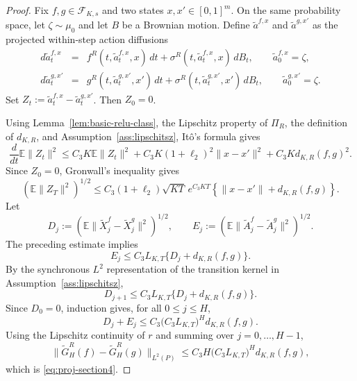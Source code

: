 \documentclass{article}
\newcommand{\1}{\mathbbm{1}}
\numberwithin{equation}{section}
\begin{document}
\begin{proof}

Fix \(f,g\in\mathcal F_{K,s}\) and two states
\(x,x'\in[0,1]^m\). On the same probability space, let
\(\zeta\sim\mu_0\) and let \(B\) be a Brownian motion. Define
\(\widetilde a^{f,x}\) and \(\widetilde a^{g,x'}\) as the projected
within-step action diffusions
\begin{eqnarray*}
    d\widetilde a^{f,x}_t
&=&
f^R(t,\widetilde a^{f,x}_t,x)\,dt
+
\sigma^R(t,\widetilde a^{f,x}_t,x)\,dB_t,
\qquad
\widetilde a^{f,x}_0=\zeta,\\
d\widetilde a^{g,x'}_t
&=&
g^R(t,\widetilde a^{g,x'}_t,x')\,dt
+
\sigma^R(t,\widetilde a^{g,x'}_t,x')\,dB_t,
\qquad
\widetilde a^{g,x'}_0=\zeta.
\end{eqnarray*}
Set \(Z_t:=\widetilde a^{f,x}_t-\widetilde a^{g,x'}_t\). Then
\(Z_0=0\).

Using Lemma~\ref{lem:basic-relu-class}, the Lipschitz property of \(\Pi_R\), the definition of \(d_{K,R}\), and Assumption~\ref{ass:lipschitsz}, It\^o's formula gives
\[
 \frac{d}{dt}\mathbb E\|Z_t\|^2
 \le
 C_3K\mathbb E\|Z_t\|^2
 +C_3K(1+\ell_2)^2\|x-x'\|^2
 +C_3K d_{K,R}(f,g)^2.
\]
Since \(Z_0=0\), Gronwall's inequality gives
\[
 \left(\mathbb E\|Z_T\|^2\right)^{1/2}
 \le
 C_3(1+\ell_2)\sqrt{KT}\,e^{C_3KT}
 \left\{\|x-x'\|+d_{K,R}(f,g)\right\}.
\]
Let
\[
 D_j:=\left(\mathbb E\|\widetilde X_j^f-\widetilde X_j^g\|^2\right)^{1/2},
 \qquad
 E_j:=\left(\mathbb E\|\widetilde A_j^f-\widetilde A_j^g\|^2\right)^{1/2}.
\]
The preceding estimate implies
\[
 E_j\le C_3L_{K,T}\{D_j+d_{K,R}(f,g)\}.
\]
By the synchronous \(L^2\) representation of the transition kernel in Assumption~\ref{ass:lipschitsz},
\[
 D_{j+1}\le C_3L_{K,T}\{D_j+d_{K,R}(f,g)\}.
\]
Since \(D_0=0\), induction gives, for all \(0\le j\le H\),
\[
 D_j+E_j\le C_3\big(C_3L_{K,T}\big)^Hd_{K,R}(f,g).
\]
Using the Lipschitz continuity of \(r\) and summing over \(j=0,\ldots,H-1\),
\[
 \|\widetilde G_H^R(f)-\widetilde G_H^R(g)\|_{L^2(P)}
 \le C_3H\big(C_3L_{K,T}\big)^Hd_{K,R}(f,g),
\]
which is \eqref{eq:proj-section4}.
\end{proof}
\end{document}
